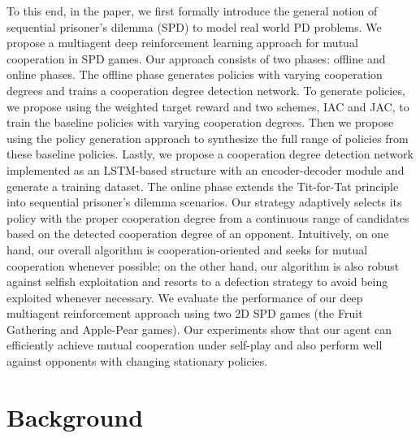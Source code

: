 \documentclass{article}
\begin{document}
To this end, in the paper, we first formally introduce the general notion of sequential prisoner's dilemma (SPD) to model real world PD problems. We propose a multiagent deep reinforcement learning approach for mutual cooperation in SPD games. Our approach consists of two phases: offline and online phases. The offline phase generates policies with varying cooperation degrees and trains a cooperation degree detection network.  To generate policies,  we propose using the weighted target reward and two schemes, IAC and JAC, to train the baseline policies with varying cooperation degrees. Then we propose using the policy generation approach to synthesize the full range of policies from these baseline policies. Lastly, we propose a cooperation degree detection network implemented as an LSTM-based structure with an encoder-decoder module and generate a training dataset. The online phase extends the Tit-for-Tat principle into sequential prisoner's dilemma scenarios. Our strategy adaptively selects its policy with the proper cooperation degree from a continuous range of candidates based on the detected cooperation degree of an opponent. Intuitively, on one hand, our overall algorithm is cooperation-oriented and seeks for mutual cooperation whenever possible; on the other hand, our algorithm is also robust against selfish exploitation and resorts to a defection strategy to avoid being exploited whenever necessary. We evaluate the performance of our deep multiagent reinforcement approach using two 2D SPD games (the Fruit Gathering and Apple-Pear games).
Our experiments show that our agent can efficiently achieve mutual cooperation under self-play and also perform well against opponents with changing stationary policies.

\begin{comment}
The remainder of this paper is organized as follows. Section 2 presents the background related to SPD. Section 3 formally introduces our approach approach and proposed approach. Section 4 describes the simulation setup and discusses the simulation results. Finally, Section 5 summarizes the paper and points out future work.
\end{comment}


\section{Background}
\end{document}
